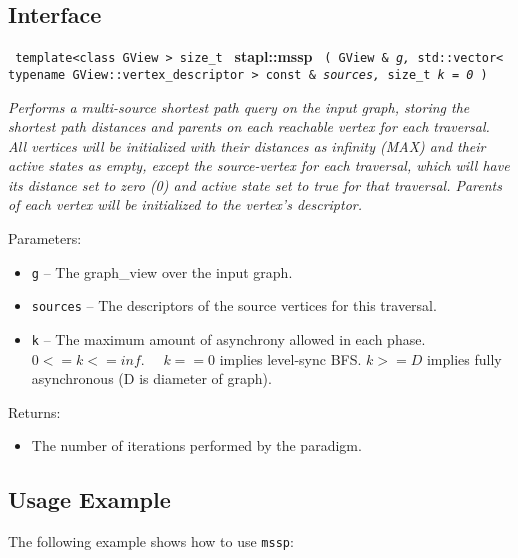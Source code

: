 \subsection{Interface} \label{sec-mssp-alg-inter}

\noindent
\texttt{%
template<class GView >
\newline
size\_t 
}
\newline
\textbf{stapl::mssp}%
\newline
\texttt{%
(
GView \&
\textit{g,}%
std::vector< typename GView::vertex\_descriptor > const \&
\textit{sources,}%
size\_t
\textit{k = 0}%
)     
}
\vspace{0.4cm}

\textit{
Performs a multi-source shortest path query on the input graph, storing the shortest path distances and parents on each reachable vertex for each traversal. 
All vertices will be initialized with their distances as infinity (MAX) and their active states as empty, except the source-vertex for each traversal, which will have its distance set to zero (0) and active state set to true for that traversal. 
Parents of each vertex will be initialized to the vertex's descriptor.
}
\vspace{0.4cm}

Parameters:
\begin{itemize}
\item
\texttt{g} --
The graph\_view over the input graph.
\item
\texttt{sources} --
The descriptors of the source vertices for this traversal.
\item
\texttt{k} --
The maximum amount of asynchrony allowed in each phase. $0 <= k <= inf.$ \ \ $k == 0$ implies level-sync BFS. $k >= D$ implies fully asynchronous (D is diameter of graph).
\end{itemize}

Returns:
\begin{itemize}
\item
The number of iterations performed by the paradigm. 
\end{itemize}

\subsection{Usage Example} \label{sec-mssp-alg-use}

The following example shows how to use 
\texttt{mssp}:


